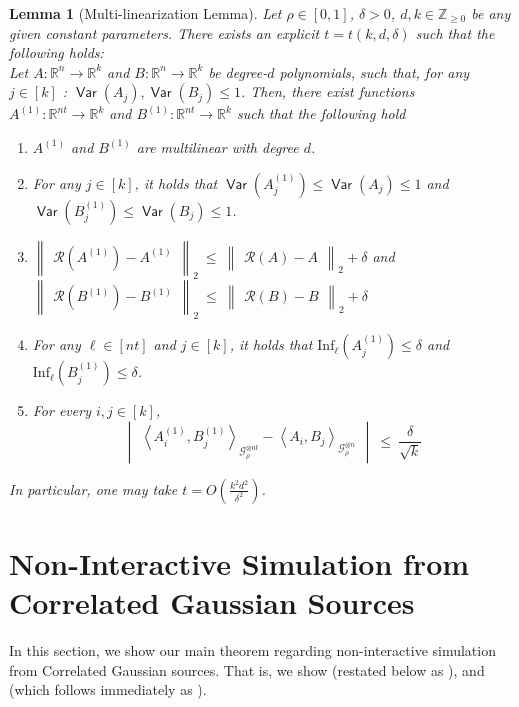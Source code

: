 \documentclass[11pt]{article}
\newcommand{\inparen}[1]{\left ( #1 \right )}
\newcommand{\inangle}[1]{\left \langle #1 \right \rangle}
\newcommand{\inabs}[1]{\begin{vmatrix} #1 \end{vmatrix}}
\newcommand{\norm}[2]{\begin{Vmatrix} #2 \end{Vmatrix}_{#1}}
\DeclareMathOperator*{\Var}{\mathsf{Var}}
\newcommand{\bbR}{{\mathbb R}}
\newcommand{\bbZ}{{\mathbb Z}}
\newcommand{\calG}{\mathcal{G}}
\newcommand{\calR}{\mathcal{R}}
\newcommand{\Inf}{\mathrm{Inf}}
\newtheorem{lem}[theorem]{Lemma}
\begin{document}
\begin{lem}[Multi-linearization Lemma] \label{lem:multilin_main}
	Let $\rho \in [0,1]$, $\delta > 0$, $d, k \in \bbZ_{\ge 0}$ be any given constant parameters. There exists an explicit $t = t(k, d, \delta)$ such that the following holds:\\
	
	\noindent Let $A : \bbR^n \to \bbR^k$ and $B : \bbR^n \to \bbR^k$ be degree-$d$ polynomials, such that, for any $j \in [k]$ : $\Var(A_j), \Var(B_j) \le 1$. Then, there exist functions $A^{(1)} : \bbR^{nt} \to \bbR^k$ and $B^{(1)} : \bbR^{nt} \to \bbR^k$ such that the following hold
	
	\begin{enumerate}
		\item $A^{(1)}$ and $B^{(1)}$ are multilinear with degree $d$.
		\item For any $j \in [k]$, it holds that $\Var(A^{(1)}_j) \le \Var(A_j) \le 1$ and $\Var(B^{(1)}_j) \le \Var(B_j) \le 1$.
		\item $\norm{2}{\calR(A^{(1)}) - A^{(1)}} ~\le~ \norm{2}{\calR(A) - A} + \delta$ and $\norm{2}{\calR(B^{(1)}) - B^{(1)}} ~\le~ \norm{2}{\calR(B) - B} + \delta$
		\item For any $\ell \in [nt]$ and $j \in [k]$, it holds that $\Inf_\ell(A^{(1)}_j) \le \delta$ and $\Inf_\ell(B^{(1)}_j) \le \delta$.
		\item For every $i, j \in [k]$,
		\[ \inabs{\inangle{A^{(1)}_i, B^{(1)}_j}_{\calG_\rho^{\otimes nt}} - \inangle{A_i, B_j}_{\calG_\rho^{\otimes n}}} ~\le~ \frac{\delta}{\sqrt{k}} \]
	\end{enumerate}
	
	\noindent In particular, one may take $t = O\inparen{\frac{k^2 d^2}{\delta^2}}$. %
\end{lem}


\section{Non-Interactive Simulation from Correlated Gaussian Sources} \label{sec:noise-stability}

In this section, we show our main theorem regarding non-interactive simulation from Correlated Gaussian sources. That is, we show  (restated below as ), and  (which follows immediately as ). %
\end{document}
